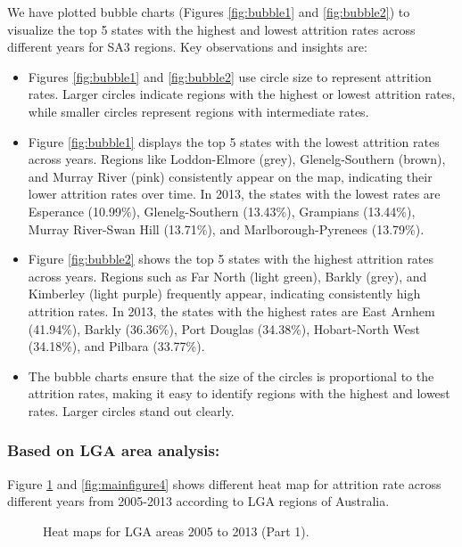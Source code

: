 \documentclass[conference]{IEEEtran}
\begin{document}
We have plotted bubble charts (Figures \ref{fig:bubble1} and \ref{fig:bubble2}) to visualize the top 5 states with the highest and lowest attrition rates across different years for SA3 regions. Key observations and insights are:
\begin{itemize} 
    \item Figures \ref{fig:bubble1} and \ref{fig:bubble2} use circle size to represent attrition rates. Larger circles indicate regions with the highest or lowest attrition rates, while smaller circles represent regions with intermediate rates.
    \item Figure \ref{fig:bubble1} displays the top 5 states with the lowest attrition rates across years. Regions like Loddon-Elmore (grey), Glenelg-Southern (brown), and Murray River (pink) consistently appear on the map, indicating their lower attrition rates over time. In 2013, the states with the lowest rates are Esperance (10.99\%), Glenelg-Southern (13.43\%), Grampians (13.44\%), Murray River-Swan Hill (13.71\%), and Marlborough-Pyrenees (13.79\%). 
    \item Figure \ref{fig:bubble2} shows the top 5 states with the highest attrition rates across years. Regions such as Far North (light green), Barkly (grey), and Kimberley (light purple) frequently appear, indicating consistently high attrition rates. In 2013, the states with the highest rates are East Arnhem (41.94\%), Barkly (36.36\%), Port Douglas (34.38\%), Hobart-North West (34.18\%), and Pilbara (33.77\%). 
    \item The bubble charts ensure that the size of the circles is proportional to the attrition rates, making it easy to identify regions with the highest and lowest rates. Larger circles stand out clearly. 
\end{itemize}
\par
\vspace{10pt}
\subsubsection{Based on LGA area analysis:}
Figure \ref{fig:mainfigure3} and \ref{fig:mainfigure4} shows different heat map for attrition rate across different years from 2005-2013 according to LGA regions of Australia.

\par
\vspace{10pt}

\begin{figure}[H]
    \centering
    \vskip5pt
    \vspace{10pt}
    \caption{Heat maps for LGA areas 2005 to 2013 (Part 1).}
    \label{fig:mainfigure3}
\end{figure}
\end{document}
